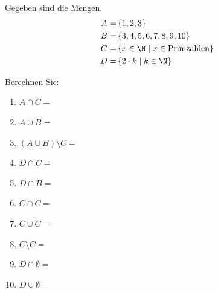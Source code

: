 \begin{ExerciseBlock}
Gegeben sind die Mengen.
\begin{align*}
	A =& \left\lbrace 1, 2, 3 \right\rbrace \\
	B =& \left\lbrace 3, 4, 5, 6, 7, 8, 9, 10 \right\rbrace \\
	C =& \left\lbrace x \in \N \; \vert \; x \in \text{Primzahlen} \right\rbrace \\
	D =& \left\lbrace 2\cdot k \; \vert \; k \in \N \right\rbrace
\end{align*}

Berechnen Sie:
\begin{enumerate}[label=\alph*)]
	\item $\displaystyle  A \cap C = $
	\item $\displaystyle A \cup B = $
	\item $\displaystyle \left( A \cup B \right) \setminus C = $
	\item $\displaystyle D \cap C = $
	\item $\displaystyle D \cap B = $
	\item $\displaystyle C \cap C = $
	\item $\displaystyle C \cup C = $
	\item $\displaystyle C \setminus C = $
	\item $\displaystyle D \cap \emptyset = $
	\item $\displaystyle D \cup \emptyset = $
\end{enumerate}

\end{ExerciseBlock}
